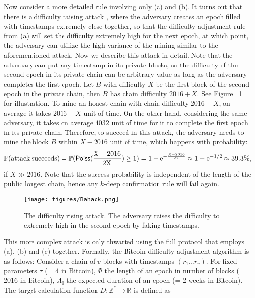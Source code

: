 \documentclass{article}
\begin{document}
Now consider a more detailed rule involving only (a) and (b). It turns out that there is a difficulty raising attack \cite{bahack2013theoretical}, where the adversary creates an epoch filled with timestamps extremely close-together, so that the difficulty adjustment rule from (a) will set the difficulty extremely high for the next epoch, at which point, the adversary can utilize the high variance of the mining similar to the aforementioned attack. Now we describe this attack in detail. Note that the adversary can put any timestamp in its private blocks, so the difficulty of the second epoch in its private chain can be arbitrary value as long as the adversary completes the first epoch. Let $B$ with difficulty $X$ be the first block of the second epoch in the private chain, then $B$ has chain difficulty $2016 +X$. See Figure ~\ref{fig:bahack} for illustration. To mine an honest chain with chain difficulty $2016 +X$, on average it takes $2016 + X$ unit of time. On the other hand, considering the same adversary, it takes on average $4032$ unit of time for it to complete the first epoch in its private chain. Therefore, to succeed in this attack, the adversary needs to mine the block $B$ within $ X - 2016$ unit of time, which happens with probability:
$$\mathbb{P}(\rm attack~succeeds) = \mathbb{P}({\sf Poiss}(\frac{X-2016}{2X})\geq 1) = 1- e^{-\frac{X-2016}{2X}} \approx 1 - e^{-1/2} \approx 39.3\%,$$
if $X \gg 2016$. Note that the success probability is independent of the length of the public longest chain, hence any $k$-deep confirmation rule will fail again.

\begin{figure}
    \centering
    \texttt{[image: figures/Bahack.png]}
    \caption{The difficulty rising attack. The adversary raises the difficulty to extremely high in the second epoch by faking timestamps.}
    \label{fig:bahack}
\end{figure}

This more complex attack is only thwarted using the full protocol that employs (a), (b) and (c) together. Formally, the Bitcoin difficulty adjustment algorithm is as follows: Consider a chain of $v$ blocks with timestamps $(r_1 \ldots r_v)$. For fixed parameters $\tau$ (= 4  in Bitcoin), $\Phi$ the length of an epoch in number of blocks (= 2016 in Bitcoin), $\Lambda_0$ the expected duration of an epoch (= 2 weeks in Bitcoin). The target calculation function $D: \mathbb{Z}^* \rightarrow \mathbb{R}$ is defined as
\end{document}
